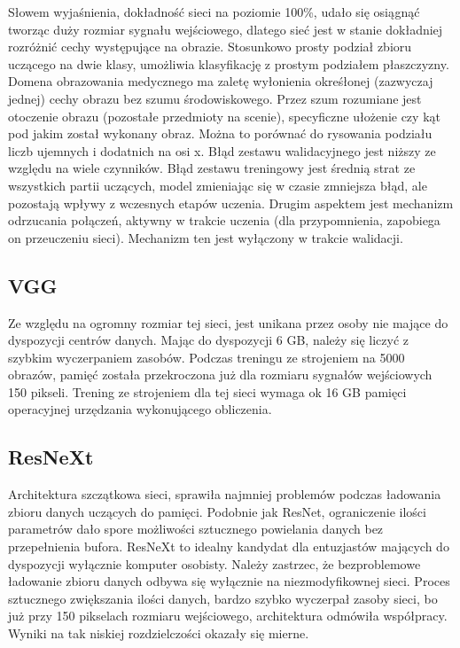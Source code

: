 \documentclass[12pt,a4paper,twoside,titlepage,openright]{book}
\begin{document}
Słowem wyjaśnienia, dokładność sieci na poziomie 100\%, udało się osiągnąć tworząc duży rozmiar sygnału wejściowego, dlatego sieć jest w stanie dokładniej rozróżnić cechy występujące na obrazie. Stosunkowo prosty podział zbioru uczącego na dwie klasy, umożliwia klasyfikację z prostym podziałem płaszczyzny. Domena obrazowania medycznego ma zaletę wyłonienia okreśłonej (zazwyczaj jednej) cechy obrazu bez szumu środowiskowego. Przez szum rozumiane jest otoczenie obrazu (pozostałe przedmioty na scenie), specyficzne ułożenie czy kąt pod jakim został wykonany obraz. Można to porównać do rysowania podziału liczb ujemnych i dodatnich na osi x.
Błąd zestawu walidacyjnego jest niższy ze względu na wiele czynników. Błąd zestawu treningowy jest średnią strat ze wszystkich partii uczących, model zmieniając się w czasie zmniejsza błąd, ale pozostają wpływy z wczesnych etapów uczenia. Drugim aspektem jest mechanizm odrzucania połączeń, aktywny w trakcie uczenia (dla przypomnienia, zapobiega on przeuczeniu sieci). Mechanizm ten jest wyłączony w trakcie walidacji.

\subsection{VGG}
Ze względu na ogromny rozmiar tej sieci, jest unikana przez osoby nie mające do dyspozycji centrów danych. Mając do dyspozycji 6 GB, należy się liczyć z szybkim wyczerpaniem zasobów. Podczas treningu ze strojeniem na 5000 obrazów, pamięć została przekroczona już dla rozmiaru sygnałów wejściowych 150 pikseli. Trening ze strojeniem dla tej sieci wymaga ok 16 GB pamięci operacyjnej urzędzania wykonującego obliczenia.

\subsection{ResNeXt}
Architektura szczątkowa sieci, sprawiła najmniej problemów podczas ładowania zbioru danych uczących do pamięci. Podobnie jak ResNet, ograniczenie ilości parametrów dało spore możliwości sztucznego powielania danych bez przepełnienia bufora. ResNeXt to idealny kandydat dla entuzjastów mających do dyspozycji wyłącznie komputer osobisty. Należy zastrzec, że bezproblemowe ładowanie zbioru danych odbywa się wyłącznie na niezmodyfikownej sieci. Proces sztucznego zwiększania ilości danych, bardzo szybko wyczerpał zasoby sieci, bo już przy 150 pikselach rozmiaru wejściowego, architektura odmówiła współpracy. Wyniki na tak niskiej rozdzielczości okazały się mierne.
\end{document}
